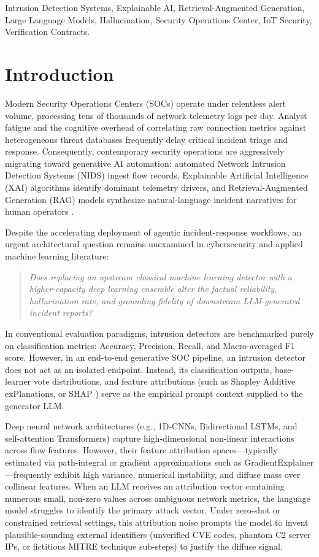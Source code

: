 \documentclass[conference]{IEEEtran}
\begin{document}
\begin{IEEEkeywords}
Intrusion Detection Systems, Explainable AI, Retrieval-Augmented Generation, Large Language Models, Hallucination, Security Operations Center, IoT Security, Verification Contracts.
\end{IEEEkeywords}

\section{Introduction}
Modern Security Operations Centers (SOCs) operate under relentless alert volume, processing tens of thousands of network telemetry logs per day. Analyst fatigue and the cognitive overhead of correlating raw connection metrics against heterogeneous threat databases frequently delay critical incident triage and response. Consequently, contemporary security operations are aggressively migrating toward generative AI automation: automated Network Intrusion Detection Systems (NIDS) ingest flow records, Explainable Artificial Intelligence (XAI) algorithms identify dominant telemetry drivers, and Retrieval-Augmented Generation (RAG) models synthesize natural-language incident narratives for human operators \cite{chou2026llm, lewis2020retrieval}.

Despite the accelerating deployment of agentic incident-response workflows, an urgent architectural question remains unexamined in cybersecurity and applied machine learning literature:
\begin{quote}
\textit{Does replacing an upstream classical machine learning detector with a higher-capacity deep learning ensemble alter the factual reliability, hallucination rate, and grounding fidelity of downstream LLM-generated incident reports?}
\end{quote}

In conventional evaluation paradigms, intrusion detectors are benchmarked purely on classification metrics: Accuracy, Precision, Recall, and Macro-averaged F1 score. However, in an end-to-end generative SOC pipeline, an intrusion detector does not act as an isolated endpoint. Instead, its classification outputs, base-learner vote distributions, and feature attributions (such as Shapley Additive exPlanations, or SHAP \cite{lundberg2017unified}) serve as the empirical prompt context supplied to the generator LLM. 

Deep neural network architectures (e.g., 1D-CNNs, Bidirectional LSTMs, and self-attention Transformers) capture high-dimensional non-linear interactions across flow features. However, their feature attribution spaces---typically estimated via path-integral or gradient approximations such as GradientExplainer---frequently exhibit high variance, numerical instability, and diffuse mass over collinear features. When an LLM receives an attribution vector containing numerous small, non-zero values across ambiguous network metrics, the language model struggles to identify the primary attack vector. Under zero-shot or constrained retrieval settings, this attribution noise prompts the model to invent plausible-sounding external identifiers (unverified CVE codes, phantom C2 server IPs, or fictitious MITRE technique sub-steps) to justify the diffuse signal.
\end{document}
